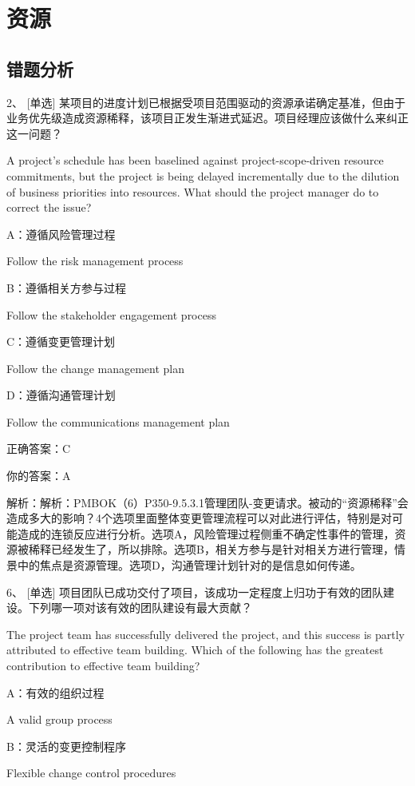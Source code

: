 
\chapter{资源}

\section{错题分析}

2、 [单选] 某项目的进度计划已根据受项目范围驱动的资源承诺确定基准，但由于业务优先级造成资源稀释，该项目正发生渐进式延迟。项目经理应该做什么来纠正这一问题？

A project's schedule has been baselined against project-scope-driven resource commitments, but the project is being delayed incrementally due to the dilution of business priorities into resources. What should the project manager do to correct the issue?

A：遵循风险管理过程

Follow the risk management process

B：遵循相关方参与过程

Follow the stakeholder engagement process

C：遵循变更管理计划

Follow the change management plan

D：遵循沟通管理计划

Follow the communications management plan

正确答案：C

你的答案：A

解析：解析：PMBOK（6）P350-9.5.3.1管理团队-变更请求。被动的“资源稀释”会造成多大的影响？4个选项里面整体变更管理流程可以对此进行评估，特别是对可能造成的连锁反应进行分析。选项A，风险管理过程侧重不确定性事件的管理，资源被稀释已经发生了，所以排除。选项B，相关方参与是针对相关方进行管理，情景中的焦点是资源管理。选项D，沟通管理计划针对的是信息如何传递。

6、 [单选] 项目团队已成功交付了项目，该成功一定程度上归功于有效的团队建设。下列哪一项对该有效的团队建设有最大贡献？

The project team has successfully delivered the project, and this success is partly attributed to effective team building. Which of the following has the greatest contribution to effective team building?

A：有效的组织过程

A valid group process

B：灵活的变更控制程序

Flexible change control procedures


